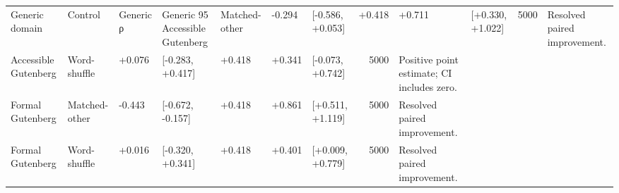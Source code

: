 \begin{tabular}{lllllllrl}
\toprule
Generic domain & Control & Generic ρ & Generic 95%
\midrule
Accessible Gutenberg & Matched-other & -0.294 & [-0.586, +0.053] & +0.418 & +0.711 & [+0.330, +1.022] & 5000 & Resolved paired improvement. \\
Accessible Gutenberg & Word-shuffle & +0.076 & [-0.283, +0.417] & +0.418 & +0.341 & [-0.073, +0.742] & 5000 & Positive point estimate; CI includes zero. \\
Formal Gutenberg & Matched-other & -0.443 & [-0.672, -0.157] & +0.418 & +0.861 & [+0.511, +1.119] & 5000 & Resolved paired improvement. \\
Formal Gutenberg & Word-shuffle & +0.016 & [-0.320, +0.341] & +0.418 & +0.401 & [+0.009, +0.779] & 5000 & Resolved paired improvement. \\
\bottomrule
\end{tabular}
